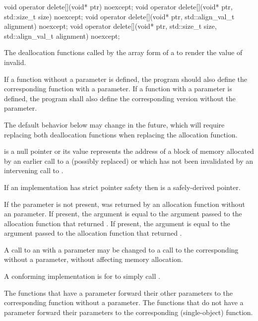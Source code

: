 %
\begin{itemdecl}
void operator delete[](void* ptr) noexcept;
void operator delete[](void* ptr, std::size_t size) noexcept;
void operator delete[](void* ptr, std::align_val_t alignment) noexcept;
void operator delete[](void* ptr, std::size_t size, std::align_val_t alignment) noexcept;
\end{itemdecl}

\begin{itemdescr}
\pnum
\effects
The
deallocation functions
called by the array form of a
to render the value of  invalid.

\pnum
\replaceable
{}
If a function without a  parameter is defined,
the program should also define
the corresponding function with a  parameter.
If a function with a  parameter is defined,
the program shall also define
the corresponding version without the  parameter.
\begin{note}
The default behavior below may change in the future, which will require
replacing both deallocation functions when replacing the allocation function.
\end{note}

\pnum
\expects
{} is a null pointer or
its value represents the address of
a block of memory allocated by
an earlier call to a (possibly replaced)
or
which has not been invalidated by an intervening call to
.

\pnum
\expects
If an implementation has strict pointer safety
then  is a safely-derived pointer.

\pnum
\expects
If the  parameter is not present,
 was returned by an allocation function
without an  parameter.
If present, the  argument
is equal to the  argument
passed to the allocation function that returned .
If present, the  argument
is equal to the  argument
passed to the allocation function that returned .

\pnum
\required
A call to an 
with a  parameter
may be changed to
a call to the corresponding 
without a  parameter,
without affecting memory allocation.
\begin{note} A conforming implementation is for
 to simply call
. \end{note}

\pnum
{}
The functions that have a  parameter
forward their other parameters
to the corresponding function without a  parameter.
The functions that do not have a  parameter
forward their parameters
to the corresponding  (single-object) function.
\end{itemdescr}

